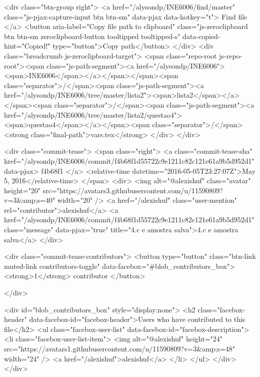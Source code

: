   <div class="btn-group right">
    <a href="/alysondp/INE6006/find/master"
          class="js-pjax-capture-input btn btn-sm"
          data-pjax
          data-hotkey="t">
      Find file
    </a>
    <button aria-label="Copy file path to clipboard" class="js-zeroclipboard btn btn-sm zeroclipboard-button tooltipped tooltipped-s" data-copied-hint="Copied!" type="button">Copy path</button>
  </div>
  <div class="breadcrumb js-zeroclipboard-target">
    <span class="repo-root js-repo-root"><span class="js-path-segment"><a href="/alysondp/INE6006"><span>INE6006</span></a></span></span><span class="separator">/</span><span class="js-path-segment"><a href="/alysondp/INE6006/tree/master/lista2"><span>lista2</span></a></span><span class="separator">/</span><span class="js-path-segment"><a href="/alysondp/INE6006/tree/master/lista2/questao4"><span>questao4</span></a></span><span class="separator">/</span><strong class="final-path">vars.tex</strong>
  </div>
</div>


  <div class="commit-tease">
      <span class="right">
        <a class="commit-tease-sha" href="/alysondp/INE6006/commit/f4b68f1d55722c9e1211c82c121e61a9b5d952d1" data-pjax>
          f4b68f1
        </a>
        <relative-time datetime="2016-05-05T23:27:07Z">May 5, 2016</relative-time>
      </span>
      <div>
        <img alt="@alexishuf" class="avatar" height="20" src="https://avatars3.githubusercontent.com/u/11590809?v=3&amp;s=40" width="20" />
        <a href="/alexishuf" class="user-mention" rel="contributor">alexishuf</a>
          <a href="/alysondp/INE6006/commit/f4b68f1d55722c9e1211c82c121e61a9b5d952d1" class="message" data-pjax="true" title="4.c e amostra salva">4.c e amostra salva</a>
      </div>

    <div class="commit-tease-contributors">
      <button type="button" class="btn-link muted-link contributors-toggle" data-facebox="#blob_contributors_box">
        <strong>1</strong>
         contributor
      </button>
      
    </div>

    <div id="blob_contributors_box" style="display:none">
      <h2 class="facebox-header" data-facebox-id="facebox-header">Users who have contributed to this file</h2>
      <ul class="facebox-user-list" data-facebox-id="facebox-description">
          <li class="facebox-user-list-item">
            <img alt="@alexishuf" height="24" src="https://avatars1.githubusercontent.com/u/11590809?v=3&amp;s=48" width="24" />
            <a href="/alexishuf">alexishuf</a>
          </li>
      </ul>
    </div>
  </div>

